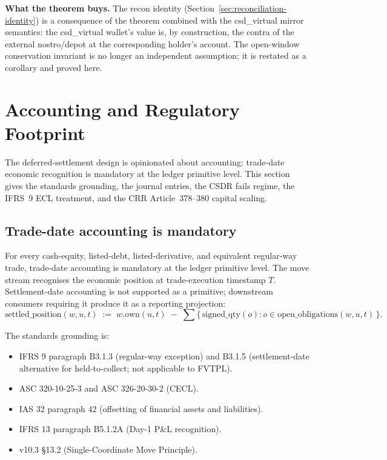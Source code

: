 \documentclass[11pt,a4paper]{article}
\begin{document}
\textbf{What the theorem buys.} The recon identity (Section~\ref{sec:reconciliation-identity}) is a consequence of the theorem combined with the csd\_virtual mirror semantics: the csd\_virtual wallet's value is, by construction, the contra of the external nostro/depot at the corresponding holder's account. The open-window conservation invariant is no longer an independent assumption; it is restated as a corollary and proved here.

\clearpage
\section{Accounting and Regulatory Footprint}
\label{sec:accounting}

The deferred-settlement design is opinionated about accounting: trade-date economic recognition is mandatory at the ledger primitive level. This section gives the standards grounding, the journal entries, the CSDR fails regime, the IFRS~9 ECL treatment, and the CRR Article~378--380 capital scaling.

\subsection{Trade-date accounting is mandatory}
\label{sec:accounting-tradedate}

For every cash-equity, listed-debt, listed-derivative, and equivalent regular-way trade, trade-date accounting is mandatory at the ledger primitive level. The move stream recognises the economic position at trade-execution timestamp $T$. Settlement-date accounting is not supported as a primitive; downstream consumers requiring it produce it as a reporting projection:
\[
\mathrm{settled\_position}(w, u, t) \;:=\; w.\mathrm{own}(u, t) \;-\; \sum \{\,\mathrm{signed\_qty}(o) : o \in \mathrm{open\_obligations}(w, u, t)\,\}.
\]

The standards grounding is:
\begin{itemize}[nosep]
\item IFRS 9 paragraph B3.1.3 (regular-way exception) and B3.1.5 (settlement-date alternative for held-to-collect; not applicable to FVTPL).
\item ASC 320-10-25-3 and ASC 326-20-30-2 (CECL).
\item IAS 32 paragraph 42 (offsetting of financial assets and liabilities).
\item IFRS 13 paragraph B5.1.2A (Day-1 P\&L recognition).
\item v10.3 \S13.2 (Single-Coordinate Move Principle).
\end{itemize}
\end{document}
